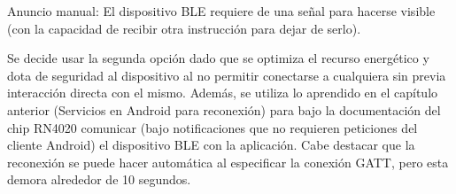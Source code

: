 	Anuncio manual: El dispositivo BLE requiere de una señal para hacerse visible (con la capacidad de recibir otra instrucción para dejar de serlo).

Se decide usar la segunda opción dado que se optimiza el recurso energético y dota de seguridad al dispositivo al no permitir conectarse a cualquiera sin previa interacción directa con el mismo. Además, se utiliza lo aprendido en el capítulo anterior (Servicios en Android para reconexión) para bajo la documentación del chip RN4020 comunicar (bajo notificaciones que no requieren peticiones del cliente Android) el dispositivo BLE con la aplicación. Cabe destacar que la reconexión se puede hacer automática al especificar la conexión GATT, pero esta demora alrededor de 10 segundos.
